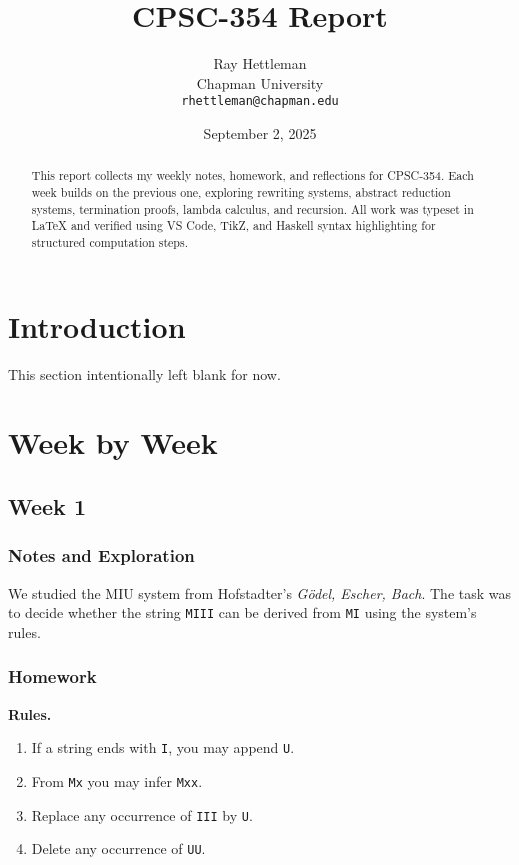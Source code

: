\documentclass[11pt]{article}
\title{CPSC-354 Report}
\author{Ray Hettleman \\ Chapman University \\ \texttt{rhettleman@chapman.edu}}
\date{September 2, 2025}
\begin{document}
\maketitle

\begin{abstract}
This report collects my weekly notes, homework, and reflections for CPSC-354. 
Each week builds on the previous one, exploring rewriting systems, abstract reduction systems, 
termination proofs, lambda calculus, and recursion. All work was typeset in \LaTeX{} 
and verified using VS Code, TikZ, and Haskell syntax highlighting for structured computation steps.
\end{abstract}

\tableofcontents
\newpage

\section{Introduction}
This section intentionally left blank for now.

\section{Week by Week}

\subsection{Week 1}

\subsubsection{Notes and Exploration}
We studied the MIU system from Hofstadter’s \emph{Gödel, Escher, Bach}. The task was to decide whether the string \texttt{MIII} can be derived from \texttt{MI} using the system’s rules.

\subsubsection{Homework}
\textbf{Rules.}
\begin{enumerate}[label=\Roman*.]
  \item If a string ends with \texttt{I}, you may append \texttt{U}.
  \item From \texttt{Mx} you may infer \texttt{Mxx}.
  \item Replace any occurrence of \texttt{III} by \texttt{U}.
  \item Delete any occurrence of \texttt{UU}.
\end{enumerate}
\end{document}
